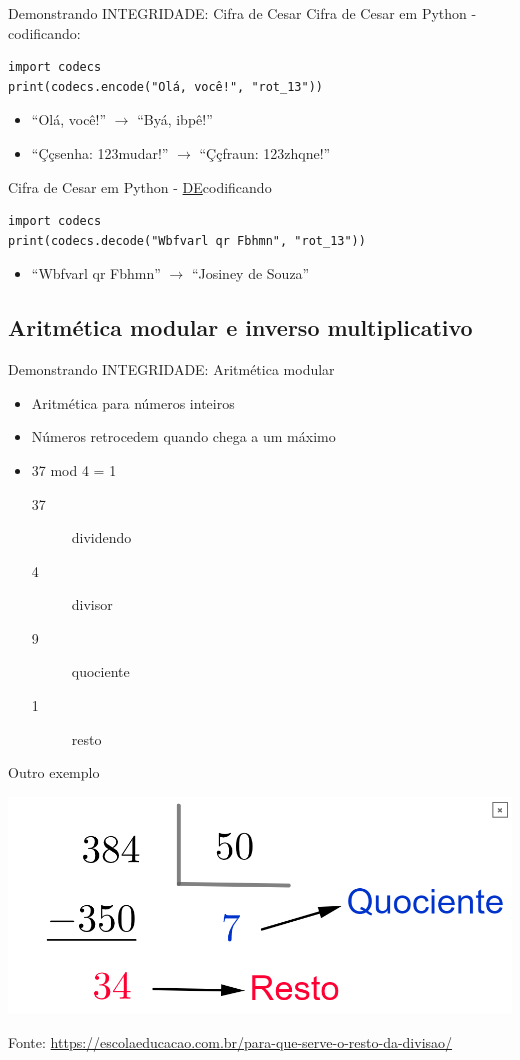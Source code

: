 \documentclass[xcolor=dvipsnames,table]{beamer}
\begin{document}
\begin{frame}[fragile]{Demonstrando INTEGRIDADE: Cifra de Cesar}
	Cifra de Cesar em Python - codificando:
	\begin{verbatim}
import codecs
print(codecs.encode("Olá, você!", "rot_13"))
	\end{verbatim}
	\begin{itemize}
		\item ``Olá, você!'' $\rightarrow$ ``Byá, ibpê!''
		\item ``Ççsenha: 123mudar!'' $\rightarrow$ ``Ççfraun: 123zhqne!''
	\end{itemize} \pause
	Cifra de Cesar em Python - \underline{DE}codificando
	\begin{verbatim}
import codecs
print(codecs.decode("Wbfvarl qr Fbhmn", "rot_13"))
	\end{verbatim}
	\begin{itemize}
		\item ``Wbfvarl qr Fbhmn'' $\rightarrow$ ``Josiney de Souza''
	\end{itemize}
\end{frame}

\subsection{Aritmética modular e inverso multiplicativo}
\begin{frame}{Demonstrando INTEGRIDADE: Aritmética modular}
	\begin{itemize}
		\item Aritmética para números inteiros
		\item Números retrocedem quando chega a um máximo
		\item 37 mod 4 = 1
		\begin{description}
			\item[37] dividendo
			\item[4] divisor
			\item[9] quociente
			\item[1] resto
		\end{description}
	\end{itemize} \pause
	Outro exemplo
	\begin{center}
		\includegraphics[scale=0.15]{resto-divisao.png}
	\end{center}
	Fonte: \url{https://escolaeducacao.com.br/para-que-serve-o-resto-da-divisao/}
\end{frame}
\end{document}
